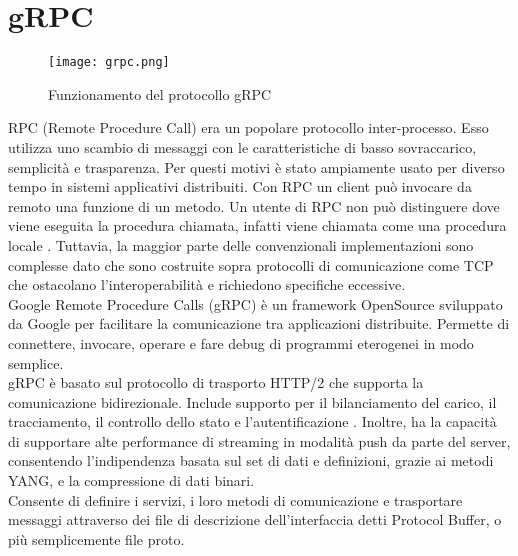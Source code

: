

\section{gRPC} \label{grpc}
\begin{figure}[h]
    \centering
   \texttt{[image: grpc.png]}
    \caption{Funzionamento del protocollo gRPC \cite{librogrpc}}
    \label{fig:grpc}
\end{figure}
RPC (Remote Procedure Call) era un popolare protocollo inter-processo\cite{librogrpc}.
Esso utilizza uno scambio di messaggi con le caratteristiche di basso sovraccarico, semplicità e trasparenza.
Per questi motivi è stato ampiamente usato per diverso tempo in sistemi applicativi distribuiti.
Con RPC un client può invocare da remoto una funzione di un metodo.
Un utente di RPC non può distinguere dove viene eseguita la procedura chiamata, infatti viene chiamata come una procedura locale \cite{grpcArt2}.
Tuttavia, la maggior parte delle convenzionali implementazioni sono complesse dato che sono costruite sopra protocolli di comunicazione come TCP che ostacolano l'interoperabilità e richiedono specifiche eccessive.
\\Google Remote Procedure Calls (gRPC\cite{grpc}) è un framework OpenSource sviluppato da Google per facilitare la comunicazione tra applicazioni distribuite. Permette di
connettere, invocare, operare e fare debug di programmi eterogenei in modo semplice.
\\gRPC è basato sul protocollo di trasporto HTTP/2 che supporta la comunicazione bidirezionale. 
Include supporto per il bilanciamento del carico, il tracciamento, il controllo dello stato e l'autentificazione\cite{grpcArt3} \cite{grpcArt1}.
Inoltre, ha la capacità di supportare alte performance di streaming in modalità push da parte del server, consentendo l'indipendenza basata sul set di dati e definizioni, grazie ai metodi YANG,
e la compressione di dati binari.
\\Consente di definire i servizi, i loro metodi di comunicazione e trasportare messaggi attraverso dei file di descrizione dell'interfaccia detti Protocol Buffer, o più semplicemente file proto.
